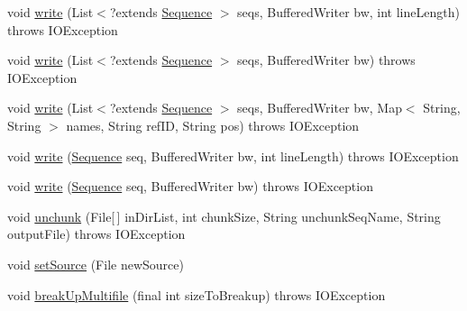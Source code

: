\begin{DoxyCompactItemize}
void \hyperlink{classbroad_1_1core_1_1sequence_1_1_fasta_sequence_i_o_ae7d949db84d5959cf527f12a106f2668}{write} (List$<$?extends \hyperlink{classbroad_1_1core_1_1sequence_1_1_sequence}{Sequence} $>$ seqs, Buffered\+Writer bw, int line\+Length)  throws I\+O\+Exception 
\item 
void \hyperlink{classbroad_1_1core_1_1sequence_1_1_fasta_sequence_i_o_ae2883033cbedcc43c948cb0cc2bc93f5}{write} (List$<$?extends \hyperlink{classbroad_1_1core_1_1sequence_1_1_sequence}{Sequence} $>$ seqs, Buffered\+Writer bw)  throws I\+O\+Exception 
\item 
void \hyperlink{classbroad_1_1core_1_1sequence_1_1_fasta_sequence_i_o_aa8c45077fa56bb1da040fb7d4edc4c25}{write} (List$<$?extends \hyperlink{classbroad_1_1core_1_1sequence_1_1_sequence}{Sequence} $>$ seqs, Buffered\+Writer bw, Map$<$ String, String $>$ names, String ref\+I\+D, String pos)  throws I\+O\+Exception 
\item 
void \hyperlink{classbroad_1_1core_1_1sequence_1_1_fasta_sequence_i_o_a1e92c89090b293611ce94032ff5bfb89}{write} (\hyperlink{classbroad_1_1core_1_1sequence_1_1_sequence}{Sequence} seq, Buffered\+Writer bw, int line\+Length)  throws I\+O\+Exception 
\item 
void \hyperlink{classbroad_1_1core_1_1sequence_1_1_fasta_sequence_i_o_a96090898406872c8a57ff30658b67252}{write} (\hyperlink{classbroad_1_1core_1_1sequence_1_1_sequence}{Sequence} seq, Buffered\+Writer bw)  throws I\+O\+Exception 
\item 
void \hyperlink{classbroad_1_1core_1_1sequence_1_1_fasta_sequence_i_o_a38d5e9db349c14c25989db4161afe9b2}{unchunk} (File\mbox{[}$\,$\mbox{]} in\+Dir\+List, int chunk\+Size, String unchunk\+Seq\+Name, String output\+File)  throws I\+O\+Exception 
\item 
void \hyperlink{classbroad_1_1core_1_1sequence_1_1_fasta_sequence_i_o_ab7b87ab64cd3b0daa838d666c711815c}{set\+Source} (File new\+Source)
\item 
void \hyperlink{classbroad_1_1core_1_1sequence_1_1_fasta_sequence_i_o_abff930d8d313b70d09e2575c8c7d61ac}{break\+Up\+Multifile} (final int size\+To\+Breakup)  throws I\+O\+Exception 
\end{DoxyCompactItemize}
